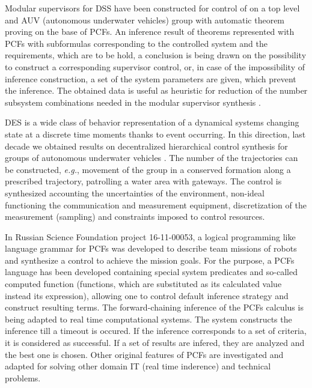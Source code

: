 \documentclass[conference]{IEEEtran}
\begin{document}
Modular supervisors for DSS have been constructed for control of on a top level and AUV (autonomous underwater vehicles) group with automatic theorem proving on the base of PCFs. An inference result of theorems represented with PCFs with subformulas corresponding to the controlled system and the requirements, which are to be hold, a conclusion is being drawn on the possibility to construct a corresponding supervisor control, or, in case of the impossibility of inference construction, a set of the system parameters are given, which prevent the inference. The obtained data is useful as heuristic for reduction of the number subsystem combinations needed in the modular supervisor synthesis \cite{supdes,langdes}.

DES is a wide class of behavior representation of a dynamical systems changing state at a discrete time moments thanks to event occurring. In this direction, last decade we obtained results on decentralized hierarchical control synthesis for groups of autonomous underwater vehicles \cite{b4}. The number of the trajectories can be constructed, \emph{e.g.}, movement of the group in a conserved formation along a prescribed trajectory, patrolling a water area with gateways. The control is synthesized accounting the uncertainties of the environment, non-ideal functioning the communication and measurement equipment, discretization of the measurement (sampling) and constraints imposed to control resources.

In Russian Science Foundation project 16-11-00053, a logical programming like language grammar for PCFs was developed to describe team missions of robots \cite{b5} and synthesize a control to achieve the mission goals. For the purpose, a PCFs language has been developed containing special system predicates and so-called computed function (functions, which are substituted as its calculated value instead its expression), allowing one to control default inference strategy and construct resulting terms. The forward-chaining inference of the PCFs calculus is being adapted to real time computational systems. The system constructs the inference till a timeout is occured.  If the inference corresponds to a set of criteria, it is considered as successful. If a set of results are infered, they are analyzed and the best one is chosen. Other original features of PCFs are investigated and adapted for solving other domain IT (real time inderence) and technical problems.
\end{document}
